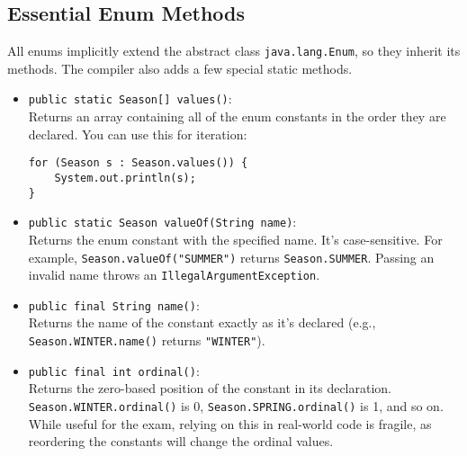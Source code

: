 \documentclass[12pt]{article}
\begin{document}
\begin{enumerate}[label=(\arabic*)]
\section{Essential Enum Methods}
All enums implicitly extend the abstract class \texttt{java.lang.Enum}, so they inherit its methods. The compiler also adds a few special static methods.

\begin{itemize}
    \item \texttt{public static Season[] values()}: \\
    Returns an array containing all of the enum constants in the order they are declared. You can use this for iteration:
    \begin{verbatim}
for (Season s : Season.values()) {
    System.out.println(s);
}
    \end{verbatim}
    \item \texttt{public static Season valueOf(String name)}: \\
    Returns the enum constant with the specified name. It's case-sensitive. For example, \texttt{Season.valueOf("SUMMER")} returns \texttt{Season.SUMMER}. Passing an invalid name throws an \texttt{IllegalArgumentException}.
    \item \texttt{public final String name()}: \\
    Returns the name of the constant exactly as it's declared (e.g., \texttt{Season.WINTER.name()} returns \texttt{"WINTER"}).
    \item \texttt{public final int ordinal()}: \\
    Returns the zero-based position of the constant in its declaration. \texttt{Season.WINTER.ordinal()} is 0, \texttt{Season.SPRING.ordinal()} is 1, and so on. While useful for the exam, relying on this in real-world code is fragile, as reordering the constants will change the ordinal values.
\end{itemize}


\end{enumerate}
\end{document}
